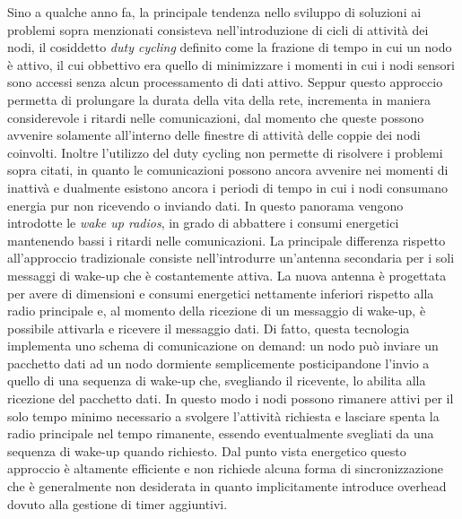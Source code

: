 \documentclass[binding=0.6cm,TFA]{sapthesis}
\begin{document}
Sino a qualche anno fa, la principale tendenza nello sviluppo di soluzioni ai problemi sopra menzionati consisteva nell'introduzione di cicli di attività
dei nodi, il cosiddetto \emph{duty cycling} definito come la frazione di tempo in cui un nodo è attivo, il cui obbettivo era quello di minimizzare i momenti
in cui i nodi sensori sono accessi senza alcun processamento di dati attivo. Seppur questo approccio permetta di prolungare la durata della vita della rete,
incrementa in maniera considerevole i ritardi nelle comunicazioni, dal momento che queste possono avvenire solamente all'interno delle finestre di attività
delle coppie dei nodi coinvolti. Inoltre l'utilizzo del duty cycling non permette di risolvere i problemi sopra citati, in quanto le comunicazioni
possono ancora avvenire nei momenti di inattivà e dualmente esistono ancora i periodi di tempo in cui i nodi consumano energia pur non ricevendo o inviando dati.
In questo panorama vengono introdotte le \emph{wake up radios}, in grado di abbattere i consumi energetici mantenendo bassi i ritardi nelle comunicazioni.
La principale differenza rispetto all'approccio tradizionale consiste nell'introdurre un'antenna secondaria per i soli messaggi di wake-up che è costantemente
attiva. La nuova antenna è progettata per avere di dimensioni e consumi energetici nettamente inferiori rispetto alla radio principale e, al momento della ricezione
di un messaggio di wake-up, è possibile attivarla e ricevere il messaggio dati. Di fatto, questa tecnologia implementa uno schema di comunicazione on demand:
un nodo può inviare un pacchetto dati ad un nodo dormiente semplicemente  posticipandone l'invio a quello di una sequenza di wake-up che, svegliando il ricevente,
lo abilita alla ricezione del pacchetto dati. In questo modo i nodi possono rimanere attivi per il solo tempo minimo necessario a svolgere l'attività richiesta
e lasciare spenta la radio principale nel tempo rimanente, essendo eventualmente svegliati da una sequenza di wake-up quando richiesto.
Dal punto vista energetico questo approccio è altamente efficiente e non richiede alcuna forma di sincronizzazione che è generalmente non desiderata in quanto
implicitamente introduce overhead dovuto alla gestione di timer aggiuntivi.\\
\end{document}
